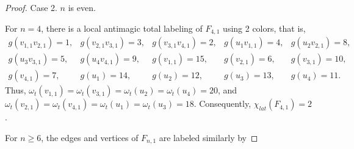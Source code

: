 \documentclass[12pt]{article}
\begin{document}
\begin{proof}
Case 2. $n$ is even.

For $n=4$, there is a local antimagic total labeling of $F_{4,1}$ using 2 colors, that is,
\begin{equation*}
  \begin{array}{lllll}
  g(v_{1,1}v_{2,1})=1, &g(v_{2,1}v_{3,1})=3, &g(v_{3,1}v_{4,1})=2,& g(u_{1}v_{1,1})=4,  &g(u_{2}v_{2,1})=8, \\[3pt]
 g(u_{3}v_{3,1})=5, & g(u_{4}v_{4,1})=9,& g(v_{1,1})=15, & g(v_{2,1})=6,  & g(v_{3,1})=10,\\[3pt]
g(v_{4,1})=7,& g(u_{1})=14, &g(u_{2})=12, &g(u_{3})=13,&g(u_{4})=11.
\end{array}
\end{equation*}
Thus, $\omega_{t}(v_{1,1})=\omega_{t}(v_{3,1})=\omega_{t}(u_{2})=\omega_{t}(u_{4})=20$, and $\omega_{t}(v_{2,1})=\omega_{t}(v_{4,1})=\omega_{t}(u_{1})=\omega_{t}(u_{3})=18$. Consequently, $\chi_{lat}(F_{4,1})=2$.

For $n\geq 6$, the edges and vertices of $F_{n,1}$ are labeled similarly by


\end{proof}
\end{document}
